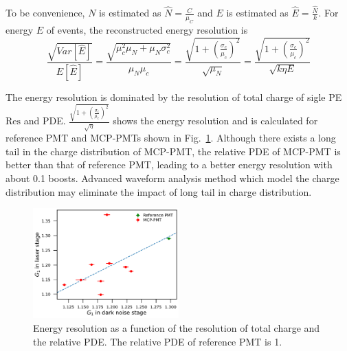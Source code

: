 To be convenience, $N$ is estimated as $\hat{N}=\frac{C}{\mu_C}$ and $E$ is estimated as $\hat{E}=\frac{\hat{N}}{k}$. For  energy $E$ of events, the reconstructed energy resolution is 
\begin{equation}
    \frac{\sqrt{Var[\hat{E}]}}{E[\hat{E}]}=\frac{\sqrt{\mu_c^2\mu_N+\mu_N\sigma_c^2}}{\mu_N\mu_c}=\frac{\sqrt{1+(\frac{\sigma_c}{\mu_c})^2}}{\sqrt{\mu_N}}=\frac{\sqrt{1+(\frac{\sigma_c}{\mu_c})^2}}{\sqrt{k\eta E}}
\end{equation}

The energy resolution is dominated by the resolution of total charge of sigle PE $\mathrm{Res}$ and PDE. $\frac{\sqrt{1+(\frac{\sigma_c}{\mu_c})^2}}{\sqrt{\eta}}$ shows the energy resolution and is calculated for reference PMT and MCP-PMTs shown in Fig.~\ref{fig:EnergyResolution}. Although there exists a long tail in the charge distribution of MCP-PMT, the relative PDE of MCP-PMT is better than that of reference PMT, leading to a better energy resolution with about 0.1 boosts. Advanced waveform analysis method which model the charge distribution may eliminate the impact of long tail in charge distribution.
\begin{figure}[!htbp]
    \centering
    \includegraphics[width=0.5\textwidth,page=14]{figures/result/compare.pdf}
    \caption{Energy resolution as a function of the resolution of total charge and the relative PDE. The relative PDE of reference PMT is 1.}
    \label{fig:EnergyResolution}
\end{figure}